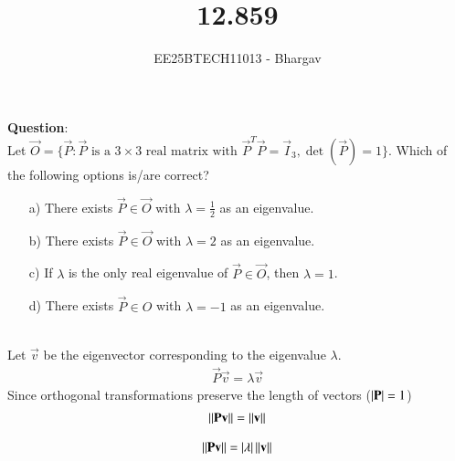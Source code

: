 \documentclass[journal]{IEEEtran}
\begin{document}

\vspace{3cm}

\title{12.859}
\author{EE25BTECH11013 - Bhargav}
\maketitle
    {\let\newpage\relax\maketitle}

\renewcommand{\thefigure}{\theenumi}
\renewcommand{\thetable}{\theenumi}
\setlength{\intextsep}{10pt} %

\renewcommand{\thetable}{\theenumi}

\textbf{Question}: \\
Let $\vec{O} = \{\vec{P} : \vec{P} \text{ is a } 3 \times 3 \text{ real matrix with } \vec{P}^T\vec{P} = \vec{I}_3, \det(\vec{P}) = 1\}$. Which of the following options is/are correct?

\begin{enumerate}
    \item[a)] There exists $\vec{P} \in \vec{O}$ with $\lambda = \frac{1}{2}$ as an eigenvalue.
    \item[b)] There exists $\vec{P} \in \vec{O}$ with $\lambda = 2$ as an eigenvalue.
    \item[c)] If $\lambda$ is the only real eigenvalue of $\vec{P} \in 
    \vec{O}$, then $\lambda = 1$.
    \item[d)] There exists $\vec{P} \in O$ with $\lambda = -1$ as an eigenvalue.
\end{enumerate}

\solution \\
Let $\vec{v}$ be the eigenvector corresponding to the eigenvalue $\lambda$.
\begin{align}
\vec{P}\vec{v} = \lambda\vec{v}
\end{align}
Since orthogonal transformations preserve the length of vectors  ($\left\vert\mathbf{P}\right\vert = 1$)
\begin{align}
\left\lVert\mathbf{P}\mathbf{v}\right\rVert=\left\lVert\mathbf{v}\right\rVert 
\end{align}

\begin{align}
\left\lVert\mathbf{P}\mathbf{v}\right\rVert = \left\vert\lambda\right\vert\left\lVert\mathbf{v}\right\rVert
\end{align}
\end{document}
